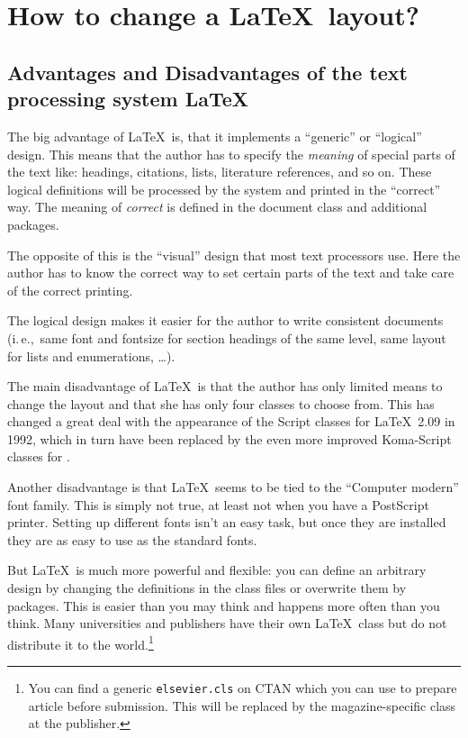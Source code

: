 \documentclass[twoside,a4paper]{refart}
\newcommand{\ie}{i.\,e.,}
\begin{document}


\section{How to change a \LaTeX\ layout?}
\label{layout}

\subsection{Advantages and Disadvantages of the text processing system \LaTeX}

 The big advantage of \LaTeX\ is, that it 
implements a ``generic'' or ``logical'' design. This means that the author has to 
specify the \emph{meaning} of special parts of the text like: 
headings, citations, lists, literature references, and so on. These 
logical definitions will be processed by the system and printed in 
the ``correct'' way. The meaning of \emph{correct} is defined in the 
document class and additional packages.

The opposite of this is the ``visual'' design 
that most text processors use. Here the author has to know the correct 
way to set certain parts of the text and take care of the correct 
printing.

The logical design makes it easier for the author to write 
consistent documents (\ie\ same font and fontsize for section headings 
of the same level, same layout for lists and enumerations, \dots).

The main disadvantage of \LaTeX\ is that the author has only limited 
means to change the layout and that she has only four classes to 
choose from. This has changed a great deal with the appearance of the 
Script classes for \LaTeX\ 2.09 in 1992, which in turn have been replaced by 
the even more improved Koma-Script classes for \LaTeXe.

Another disadvantage is that \LaTeX\ seems to be tied to the 
``Computer modern'' font family. This is simply not true, at least 
not when you have a PostScript printer. Setting up different fonts 
isn't an easy task, but once they are installed they are as easy 
to use as the standard fonts.

But \LaTeX\ is much more powerful and flexible: you can define an 
arbitrary design by changing the definitions in the class files or 
overwrite them by packages. This is easier than you may think and 
happens more often than you think. Many universities and publishers 
have their own \LaTeX\ class but do not distribute it to the 
world.\footnote{You can find a generic \texttt{elsevier.cls} on CTAN 
which you can use to prepare article before submission. This will be 
replaced by the magazine-specific class at the publisher.}
\end{document}
